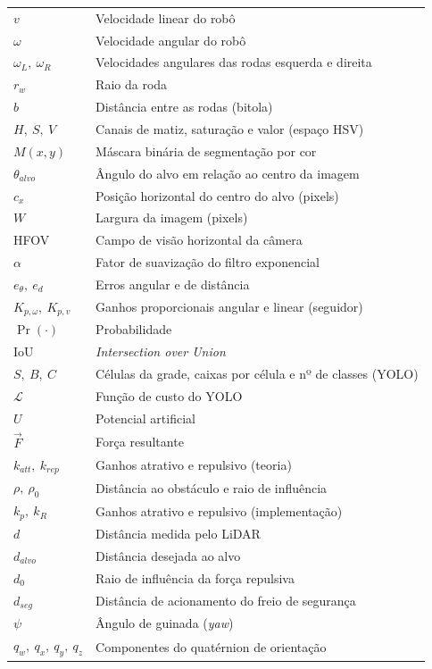 \documentclass[11pt, a4paper]{article}
\begin{document}
\renewcommand{\arraystretch}{1.3}
\noindent
\begin{tabular}{ll}
$v$                    & Velocidade linear do robô \\
$\omega$               & Velocidade angular do robô \\
$\omega_L,\ \omega_R$  & Velocidades angulares das rodas esquerda e direita \\
$r_w$                  & Raio da roda \\
$b$                    & Distância entre as rodas (bitola) \\
$H,\ S,\ V$            & Canais de matiz, saturação e valor (espaço HSV) \\
$M(x,y)$               & Máscara binária de segmentação por cor \\
$\theta_{alvo}$        & Ângulo do alvo em relação ao centro da imagem \\
$c_x$                  & Posição horizontal do centro do alvo (pixels) \\
$W$                    & Largura da imagem (pixels) \\
HFOV                   & Campo de visão horizontal da câmera \\
$\alpha$               & Fator de suavização do filtro exponencial \\
$e_\theta,\ e_d$       & Erros angular e de distância \\
$K_{p,\omega},\ K_{p,v}$ & Ganhos proporcionais angular e linear (seguidor) \\
$\Pr(\cdot)$           & Probabilidade \\
IoU                    & \textit{Intersection over Union} \\
$S,\ B,\ C$            & Células da grade, caixas por célula e nº de classes (YOLO) \\
$\mathcal{L}$          & Função de custo do YOLO \\
$U$                    & Potencial artificial \\
$\vec{F}$              & Força resultante \\
$k_{att},\ k_{rep}$    & Ganhos atrativo e repulsivo (teoria) \\
$\rho,\ \rho_0$        & Distância ao obstáculo e raio de influência \\
$k_p,\ k_R$            & Ganhos atrativo e repulsivo (implementação) \\
$d$                    & Distância medida pelo LiDAR \\
$d_{alvo}$             & Distância desejada ao alvo \\
$d_0$                  & Raio de influência da força repulsiva \\
$d_{seg}$              & Distância de acionamento do freio de segurança \\
$\psi$                 & Ângulo de guinada (\textit{yaw}) \\
$q_w,\ q_x,\ q_y,\ q_z$ & Componentes do quatérnion de orientação \\
\end{tabular}

\newpage



\end{document}

